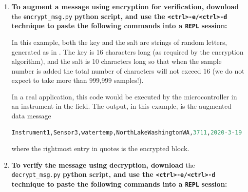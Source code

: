 \begin{enumerate}
	\item \textbf{To augment a message using encryption for verification, download} the \lstinline{encrypt_msg.py} \textbf{python script, and use the \lstinline{<ctrl>-e/<ctrl>-d} technique to paste the following commands into a \texttt{REPL} session:}
	
	
	In this example, both the key and the salt are strings of random letters, generated as in .
	The key is 16 characters long (as required by the encryption algorithm), and the salt is 10 characters long so that when the sample number is added the total number of characters will not exceed 16 (we do not expect to take more than 999,999 samples!).
	
	In a real application, this code would be executed by the microcontroller in an instrument in the field.
	The output, in this example, is the augmented data message
\begin{lstlisting}[language=Python]
Instrument1,Sensor3,watertemp,NorthLakeWashingtonWA,3711,2020-3-19 1:20:17,7.6875,b'$\\xd8\\xd8\\xa5\\x93D\\xd1\\xb3\\xd9=\\xa8$x\\xf6n\\xce'
\end{lstlisting}
	where the rightmost entry in quotes is the encrypted block.
	
	\item \textbf{To verify the message using decryption, download} the \lstinline{decrypt_msg.py} \textbf{python script, and use the \lstinline{<ctrl>-e/<ctrl>-d} technique to paste the following commands into a \texttt{REPL} session:}



\end{enumerate}
